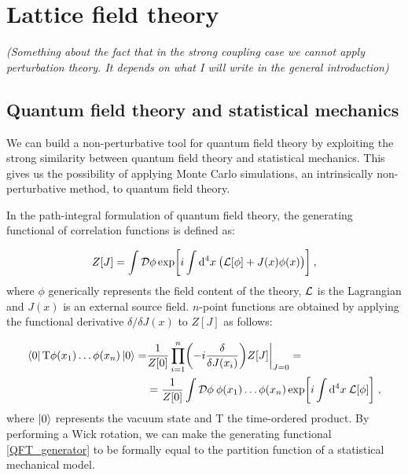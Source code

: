 \chapter{Lattice field theory}

\emph{(Something about the fact that in the strong coupling case we cannot apply perturbation theory. It depends on what I will write in the general introduction)}




\section{Quantum field theory and statistical mechanics}
\label{QFT-SM}

We can build a non-perturbative tool for quantum field theory by exploiting the strong similarity between quantum field theory and statistical mechanics. This gives us the possibility of applying Monte Carlo simulations, an intrinsically non-perturbative method, to quantum field theory.

In the path-integral formulation of quantum field theory, the generating functional of correlation functions is defined as:

\begin{equation}
Z[J] = \int \mathcal D \phi \exp \biggl[ i \int \mathrm{d}^4x \: \bigl( \mathcal L[\phi] + J(x)\phi(x) \bigr) \biggr] \: ,
\label{QFT_generator}
\end{equation}
%
where $\phi$ generically represents the field content of the theory, $\mathcal L$ is the Lagrangian and $J(x)$ is an external source field. $n$-point functions are obtained by applying the functional derivative $\delta / \delta J(x)$ to $Z[J]$ as follows:

\begin{equation}
\begin{split}
\bra{0} \mathrm T \phi(x_1) \dots \phi(x_n) \ket{0} = & \frac{1}{Z[0]} \prod_{i=1}^n \biggl( -i \frac{\delta}{\delta J(x_i)} \biggr) Z[J] \biggr\vert_{J=0} = \\
& = \frac{1}{Z[0]} \int \mathcal D \phi \: \phi(x_1) \dots \phi(x_n) \exp \biggl[ i \int \mathrm{d}^4x \: \mathcal L[\phi] \biggr] \; ,
\end{split}
\label{np_function}
\end{equation}
%
where $\ket{0}$ represents the vacuum state and T the time-ordered product.
By performing a Wick rotation, we can make the generating functional \ref{QFT_generator} to be formally equal to the partition function of a statistical mechanical model.

